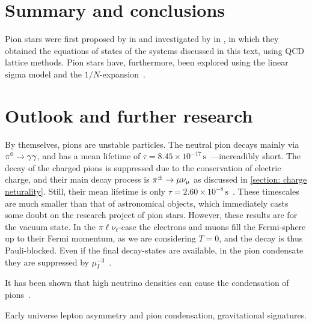 \section{Summary and conclusions}

Pion stars were first proposed by \citeauthor{carignanoScrutinizingPionCondensed2017} in \autocite{carignanoScrutinizingPionCondensed2017} and investigated by \citeauthor{brandtNewClassCompact2018} in \autocite{brandtNewClassCompact2018}, in which they obtained the equations of states of the systems discussed in this text, using QCD lattice methods.
Pion stars have, furthermore, been explored using the linear sigma model and the $1/N$-expansion~\autocite{andersenBoseEinsteinCondensationPion2018}.



\section{Outlook and further research}

By themselves, pions are unstable particles.
The neutral pion decays mainly via ${\pi^0}\rightarrow \gamma\gamma$, and has a mean lifetime of $\tau = 8.45\times 10^{-17}\,\text{s}$~\autocite{particledatagroupReviewParticlePhysics2020}---increadibly short.
The decay of the charged pions is suppressed due to the conservation of electric charge, and their main decay process is ${\pi^\pm}\rightarrow \mu \nu_\mu$ as discussed in \autoref{section: charge neturality}.
Still, their mean lifetime is only $\tau = 2.60\times 10^{-8}\,\text{s}$~\autocite{particledatagroupReviewParticlePhysics2020}.
These timescales are much smaller than that of astronomical objects, which immediately casts some doubt on the research project of pion stars.
However, these results are for the vacuum state.
In the $\pi\ell\nu_\ell$-case the electrons and muons fill the Fermi-sphere up to their Fermi momentum, as we are considering $T = 0$, and the decay is thus Pauli-blocked.
Even if the final decay-states are available, in the pion condensate they are suppressed by $\mu_I^{-3}$~\autocite{brandtNewClassCompact2018}.



It has been shown that high neutrino densities can cause the condensation of pions~\autocite{abukiPionCondensationDense2009}.

Early universe lepton asymmetry and pion condensation, gravitational signatures\autocite{vovchenkoPionCondensationEarly2021,wygasCosmicQCDEpoch2018}.


